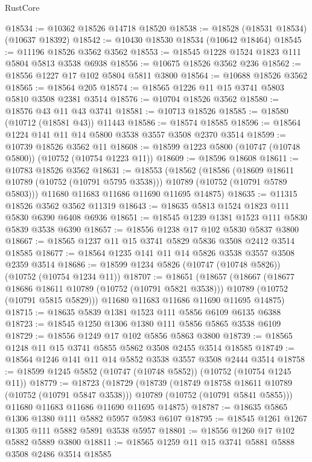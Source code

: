 \begin{lexlean}{RustCore}
\begin{coremodule}
@18534 := @10362 @18526 @14718 @18520
@18538 := @18528 (@18531 @18534) (@10637 @18392)
@18542 := @10430 @18530 @18534 (@10642 @18464)
@18545 := @11196 @18526 @3562 @3562
@18553 := @18545 @1228 @1524 @1823 @111 @5804 @5813 @3538 @6938
@18556 := @10675 @18526 @3562 @236
@18562 := @18556 @1227 @17 @102 @5804 @5811 @3800
@18564 := @10688 @18526 @3562
@18565 := @18564 @205
@18574 := @18565 @1226 @11 @15 @3741 @5803 @5810 @3508 @2381 @3514
@18576 := @10704 @18526 @3562
@18580 := @18576 @43 @11 @43 @3741
@18581 := @10713 @18526
@18585 := @18580 (@10712 (@18581 @43)) @11443
@18586 := @18574 @18585
@18596 := @18564 @1224 @141 @11 @14 @5800 @3538 @3557 @3508 @2370 @3514
@18599 := @10739 @18526 @3562 @11
@18608 := @18599 @1223 @5800 (@10747 (@10748 @5800)) (@10752 (@10754 @1223 @11))
@18609 := @18596 @18608
@18611 := @10783 @18526 @3562
@18631 := @18553
    (@18562
      (@18586
        (@18609 @18611 @10789 (@10752 (@10791 @5795 @3538)))
        @10789
        (@10752 (@10791 @5789 @5803)))
      @11680
      @11683
      @11686
      @11690
      @11695
      @14875)
@18635 := @11315 @18526 @3562 @3562 @11319
@18643 := @18635 @5813 @1524 @1823 @111 @5830 @6390 @6408 @6936
@18651 := @18545 @1239 @1381 @1523 @111 @5830 @5839 @3538 @6390
@18657 := @18556 @1238 @17 @102 @5830 @5837 @3800
@18667 := @18565 @1237 @11 @15 @3741 @5829 @5836 @3508 @2412 @3514 @18585
@18677 := @18564 @1235 @141 @11 @14 @5826 @3538 @3557 @3508 @2359 @3514
@18686 := @18599 @1234 @5826 (@10747 (@10748 @5826)) (@10752 (@10754 @1234 @11))
@18707 := @18651
    (@18657
      (@18667
        (@18677 @18686 @18611 @10789 (@10752 (@10791 @5821 @3538)))
        @10789
        (@10752 (@10791 @5815 @5829)))
      @11680
      @11683
      @11686
      @11690
      @11695
      @14875)
@18715 := @18635 @5839 @1381 @1523 @111 @5856 @6109 @6135 @6388
@18723 := @18545 @1250 @1306 @1380 @111 @5856 @5865 @3538 @6109
@18729 := @18556 @1249 @17 @102 @5856 @5863 @3800
@18739 := @18565 @1248 @11 @15 @3741 @5855 @5862 @3508 @2455 @3514 @18585
@18749 := @18564 @1246 @141 @11 @14 @5852 @3538 @3557 @3508 @2444 @3514
@18758 := @18599 @1245 @5852 (@10747 (@10748 @5852)) (@10752 (@10754 @1245 @11))
@18779 := @18723
    (@18729
      (@18739
        (@18749 @18758 @18611 @10789 (@10752 (@10791 @5847 @3538)))
        @10789
        (@10752 (@10791 @5841 @5855)))
      @11680
      @11683
      @11686
      @11690
      @11695
      @14875)
@18787 := @18635 @5865 @1306 @1380 @111 @5882 @5957 @5983 @6107
@18795 := @18545 @1261 @1267 @1305 @111 @5882 @5891 @3538 @5957
@18801 := @18556 @1260 @17 @102 @5882 @5889 @3800
@18811 := @18565 @1259 @11 @15 @3741 @5881 @5888 @3508 @2486 @3514 @18585

\end{coremodule}
\end{lexlean}
